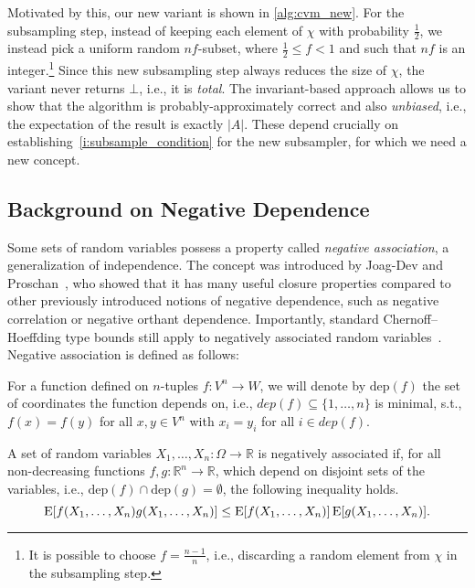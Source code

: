 Motivated by this, our new variant is shown in \cref{alg:cvm_new}.
For the subsampling step, instead of keeping each element of $\chi$ with probability $\frac{1}{2}$, we instead pick a uniform random $nf$-subset, where $\frac{1}{2} \leq f < 1$ and such that $nf$ is an integer.\footnote{It is possible to choose $f = \frac{n-1}{n}$, i.e., discarding a random element from $\chi$ in the subsampling step.}
Since this new subsampling step always reduces the size of $\chi$, the variant never returns $\bot$, i.e., it is \emph{total}.
The invariant-based approach allows us to show that the algorithm is probably-approximately correct and also \emph{unbiased}, i.e., the expectation of the result is exactly $|A|$.
These depend crucially on establishing~\cref{i:subsample_condition} for the new subsampler, for which we need a new concept.

\subsection{Background on Negative Dependence}
Some sets of random variables possess a property called \emph{negative association}, a generalization of independence.
The concept was introduced by Joag-Dev and Proschan~\cite{joagdev1983}, who showed that it has many useful closure properties compared to other previously introduced notions of negative dependence, such as negative correlation or negative orthant dependence. %
Importantly, standard Chernoff--Hoeffding type bounds still apply to negatively associated random variables~\cite[Prop. 7]{dubhashi1998}.
Negative association is defined as follows:
\begin{definition}
For a function defined on $n$-tuples $f: V^n \rightarrow W$, we will denote by $\mathrm{dep}(f)$ the set of coordinates the function depends on, i.e., $dep(f) \subseteq \{1,\ldots,n\}$ is minimal, s.t., $f(x) = f(y)$ for all $x, y \in V^n$ with $x_i = y_i$ for all $i \in dep(f)$.
\end{definition}

\begin{definition}\label{def:neg_assoc}
A set of random variables $X_1,\dots,X_n: \Omega \rightarrow \mathbb R$ is negatively associated if, for all non-decreasing functions $f,g: \mathbb R^n \rightarrow \mathbb R$, which depend on disjoint sets of the variables, i.e., $\mathrm{dep}(f) \cap \mathrm{dep}(g) = \emptyset$, the following inequality holds.
\[
\operatorname{\mathrm{E}} [f(X_1,\ldots,X_n) g(X_1,\ldots,X_n)] \leq \operatorname{\mathrm{E}} [f(X_1,\ldots,X_n)] \operatorname{\mathrm{E}} [g(X_1,\ldots,X_n)] \textrm{.}
\]
\end{definition}

